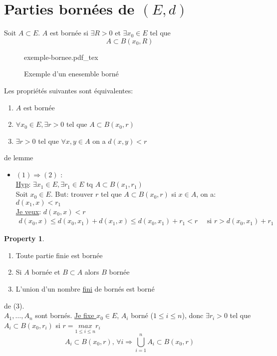\documentclass[a4paper]{report}
\let\implies\Rightarrow
\theoremstyle{definition}
\newtheorem*{property}{Property}
\newcommand{\incfig}[1]{%
    \def\svgwidth{\columnwidth}
    {#1.pdf_tex}
}
\begin{document}
\section{Parties bornées de $(E, d)$}
\begin{definition}
    Soit $A \subset E$. $A$ est bornée si  $\exists R > 0$ et $\exists x_0 \in E$ tel que 
    \[
    A \subset B(x_0, R)
    \] 
\end{definition}
\begin{figure}[H]
    \centering
    \incfig{exemple-bornee}
    \caption{Exemple d'un enesemble borné}
    \label{fig:exemple-bornee}
\end{figure}
\begin{lemma}
   Les propriétés suivantes sont équivalentes:
   \begin{enumerate}
       \item $A$ est bornée
       \item  $\forall x_0 \in E, \exists r > 0$ tel que $A \subset B(x_0, r)$
       \item $\exists r > 0$ tel que $\forall x, y \in A$ on a $d(x, y) < r$
   \end{enumerate}
\end{lemma}
\begin{explanation} de lemme
   \begin{itemize}
       \item $(1) \implies (2)$ :\\
           \underline{Hyp}: $\exists x_1 \in E, \exists r_1 \in E$ tq $A \subset B(x_1, r_1)$\\
           Soit $x_0 \in E$. But: trouver $r$ tel que  $A \subset B(x_0, r)$ si $x \in A$, on a:  $d(x_1, x) < r_1$\\
           \underline{Je veux}: $d(x_0, x) <r$\\
          \begin{align*}
              d(x_0, x) \le d(x_0, x_1) + d(x_1, x) \le d(x_0, x_1) + r_1 < r \quad \text{ si } r > d(x_0, x_1) + r_1
          \end{align*} 
   \end{itemize} 
\end{explanation}
\begin{property}
   \begin{enumerate}
       \item Toute partie finie est bornée
       \item Si $A$ bornée et  $B \subset A$ alors $B$ bornée
       \item L'union d'un nombre \underline{fini} de bornés est borné
   \end{enumerate} 
\end{property}
\begin{preuve}{de (3).}\\
    $A_1, \ldots, A_n$ sont bornés. \underline{Je fixe $x_0 \in E$}, $A_i$ borné ($1 \le i \le n$), donc $\exists r_i > 0$ tel que $A_i \subset B(x_0, r_i)$ si $r = \underset{1 \le  i \le n}{max} r_i$ 
    \[
        A_i \subset B(x_0, r), \, \forall i \implies \bigcup\limits_{i=1}^{n} A_i \subset B(x_0, r)
    \] 
\end{preuve}
\end{document}
